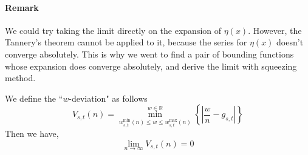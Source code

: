 \documentclass[]{article}
\begin{document}
\paragraph{Remark}

We could try taking the limit directly on the expansion of $\eta(x)$. However, the Tannery's theorem cannot be applied to it, because the series for $\eta(x)$ doesn't converge absolutely. This is why we went to find a pair of bounding functions whose expansion does converge absolutely, and derive the limit with squeezing method.

\vspace{1cm}
\begin{lemma}[$w$ limit]
	We define the ``$w$-deviation" as follows
	\[
		V_{s,t}(n) = \min_{w_{s,t}^{\min}(n)\le w \le w_{s,t}^{\max}(n)}^{w\in\mathbb{R}} \left\{ \left|\frac{w}{n} - g_{s,t}\right| \right\}
	\]
	Then we have, 
	\[
	\lim_{n\to\infty} V_{s,t}(n) = 0
	\]
\end{lemma}
\end{document}
